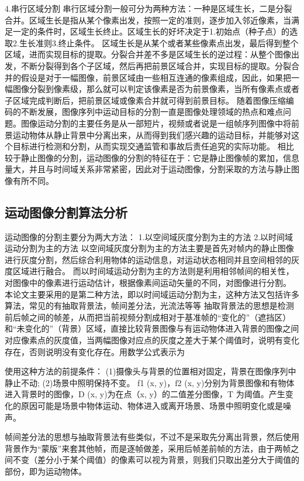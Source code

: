 \documentclass[18pt, twoside, a4paper, dvipdfm]{book}
\begin{document}
4.串行区域分割
串行区域分割一般可分为两种方法：一种是区域生长，二是分裂合并。区域生长是指从某个像素出发，按照一定的准则，逐步加入邻近像素，当满足一定的条件时，区域生长终止。区域生长的好坏决定于1.初始点（种子点）的选取2.生长准则3.终止条件。
区域生长是从某个或者某些像素点出发，最后得到整个区域，进而实现目标的提取。分裂合并差不多是区域生长的逆过程：从整个图像出发，不断分裂得到各个子区域，然后再把前景区域合并，实现目标的提取。分裂合并的假设是对于一幅图像，前景区域由一些相互连通的像素组成，因此，如果把一幅图像分裂到像素级，那么就可以判定该像素是否为前景像素，当所有像素点或者子区域完成判断后，把前景区域或像素合并就可得到前景目标。
随着图像压缩编码的不断发展，图像序列中运动目标的分割一直是图像处理领域的热点和难点问题。图像运动分割的主要任务是从一部短片，视频或者说是一组帧序列图像中将前景运动物体从静止背景中分离出来，从而得到我们感兴趣的运动目标，并能够对这个目标进行检测和分割，从而实现交通监管和事故后责任追究的实际功能。
相比较于静止图像的分割，运动图像的分割的特征在于：它是静止图像帧的累加，信息量大，并且与时间域关系非常紧密，因此对于运动图像，分割采取的方法与静止图像有所不同。

\subsection{运动图像分割算法分析}

运动图像的分割主要分为两大方法：
1.以空间域灰度分割为主的方法
2.以时间域运动分割为主的方法
以空间域灰度分割为主的方法主要是首先对帧内的静止图像进行灰度分割，然后综合利用物体的运动信息，对运动状态相同并且空间相邻的灰度区域进行融合。
而以时间域运动分割为主的方法则是利用相邻帧间的相关性，对图像中的像素进行运动估计，根据像素间运动矢量的不同，对图像进行分割。
本论文主要采用的是第二种方法，即以时间域运动分割为主，这种方法又包括许多算法，常见的有抽取背景法，帧间差分法，光流法等等
抽取背景法的思想是检测前后帧之间的帧差，从而把当前视频分割成相对于基准帧的“变化的”（遮挡区）和“未变化的”（背景）区域，直接比较背景图像与有运动物体进入背景的图像之间对应像素点的灰度值，当两幅图像对应点的灰度之差大于某个阈值时，说明有变化存在，否则说明没有变化存在。用数学公式表示为

 
使用这种方法的前提条件：
(1)摄像头与背景的位置相对固定，背景在图像序列中静止不动;
(2)场景中照明保持不变。
f1 (x, y)，f2 (x, y)分别为背景图像和有物体进入背景时的图像，D (x, y)为在点（x, y）的二值差分图像，T 为阈值。产生变化的原因可能是场景中物体运动、物体进入或离开场景、场景中照明变化或是噪声。

帧间差分法的思想与抽取背景法有些类似，不过不是采取先分离出背景，然后使用背景作为“蒙版”来套其他帧，而是逐帧做差，采用后帧差前帧的方法，由于两帧之间不变（差分小于某个阈值）的像素可以视为背景，则我们只取出差分大于阈值的部份，即为运动物体。
\end{document}
